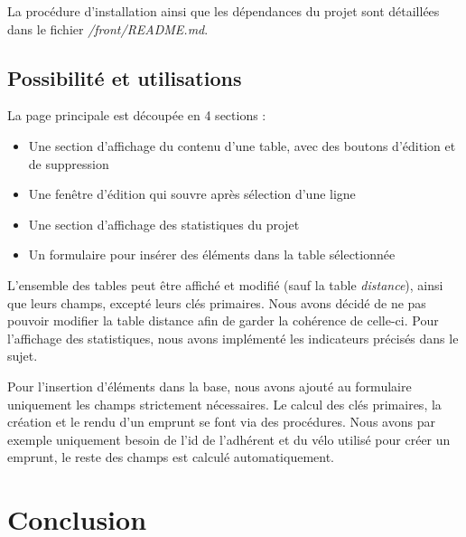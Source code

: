 \documentclass[10pt]{article}
\begin{document}
  La procédure d'installation ainsi que les dépendances du projet sont détaillées dans le fichier \mbox{\textit{/front/README.md}}.
  
  \subsection{Possibilité et utilisations}\label{subsec:possib}
  
La page principale est découpée en 4 sections :
  \begin{itemize}
  \item Une section d'affichage du contenu d'une table, avec des boutons d'édition et de suppression
  \item Une fenêtre d'édition qui souvre après sélection d'une ligne
  \item Une section d'affichage des statistiques du projet
  \item Un formulaire pour insérer des éléments dans la table sélectionnée \\
\end{itemize}

L'ensemble des tables peut être affiché et modifié (sauf la table \textit{distance}), ainsi que leurs champs, excepté leurs clés primaires. Nous avons décidé de ne pas pouvoir modifier la table distance afin de garder la cohérence de celle-ci. Pour l'affichage des statistiques, nous avons implémenté les indicateurs précisés dans le sujet.

Pour l'insertion d'éléments dans la base, nous avons ajouté au formulaire uniquement les champs strictement nécessaires. Le calcul des clés primaires, la création et le rendu d'un emprunt se font via des procédures. Nous avons par exemple uniquement besoin de l'id de l'adhérent et du vélo utilisé pour créer un emprunt, le reste des champs est calculé automatiquement.

  \section{Conclusion}\label{sec:ccl}
\end{document}

